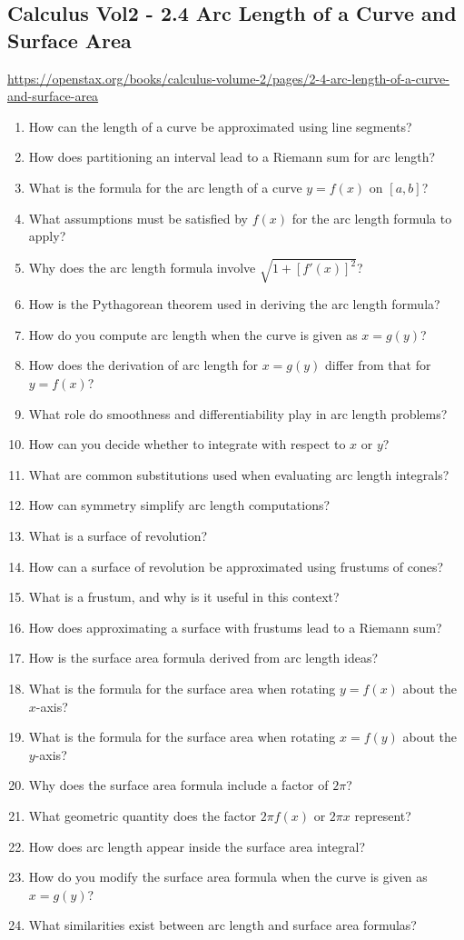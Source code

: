 \subsection{Calculus Vol2 - 2.4 Arc Length of a Curve and Surface Area}

\url{https://openstax.org/books/calculus-volume-2/pages/2-4-arc-length-of-a-curve-and-surface-area}

\begin{enumerate}
  \item How can the length of a curve be approximated using line segments?
  \item How does partitioning an interval lead to a Riemann sum for arc length?
  \item What is the formula for the arc length of a curve \(y=f(x)\) on \([a,b]\)?
  \item What assumptions must be satisfied by \(f(x)\) for the arc length formula to apply?
  \item Why does the arc length formula involve \(\sqrt{1+[f'(x)]^{2}}\)?
  \item How is the Pythagorean theorem used in deriving the arc length formula?
  \item How do you compute arc length when the curve is given as \(x=g(y)\)?
  \item How does the derivation of arc length for \(x=g(y)\) differ from that for \(y=f(x)\)?
  \item What role do smoothness and differentiability play in arc length problems?
  \item How can you decide whether to integrate with respect to \(x\) or \(y\)?
  \item What are common substitutions used when evaluating arc length integrals?
  \item How can symmetry simplify arc length computations?
  \item What is a surface of revolution?
  \item How can a surface of revolution be approximated using frustums of cones?
  \item What is a frustum, and why is it useful in this context?
  \item How does approximating a surface with frustums lead to a Riemann sum?
  \item How is the surface area formula derived from arc length ideas?
  \item What is the formula for the surface area when rotating \(y=f(x)\) about the \(x\)-axis?
  \item What is the formula for the surface area when rotating \(x=f(y)\) about the \(y\)-axis?
  \item Why does the surface area formula include a factor of \(2\pi\)?
  \item What geometric quantity does the factor \(2\pi f(x)\) or \(2\pi x\) represent?
  \item How does arc length appear inside the surface area integral?
  \item How do you modify the surface area formula when the curve is given as \(x=g(y)\)?
  \item What similarities exist between arc length and surface area formulas?
\end{enumerate}
